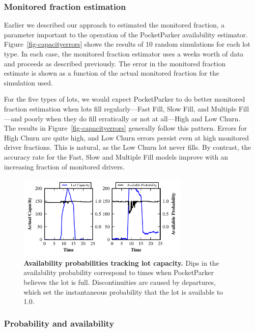 \subsubsection{Monitored fraction estimation}

Earlier we described our approach to estimated the monitored fraction, a
parameter important to the operation of the PocketParker availability
estimator. Figure~\ref{fig-capacityerrors} shows the results of 10 random
simulations for each lot type. In each case, the monitored fraction estimator
uses a weeks worth of data and proceeds as described previously. The error in
the monitored fraction estimate is shown as a function of the actual
monitored fraction for the simulation used.

For the five types of lots, we would expect PocketParker to do better
monitored fraction estimation when lots fill regularly---Fast Fill, Slow
Fill, and Multiple Fill---and poorly when they do fill erratically or not at
all---High and Low Churn. The results in Figure~\ref{fig-capacityerrors}
generally follow this pattern. Errors for High Churn are quite high, and Low
Churn errors persist even at high monitored driver fractions. This is
natural, as the Low Churn lot never fills.  By contrast, the accuracy rate for
the Fast, Slow and Multiple Fill models improve with an increasing fraction of
monitored drivers.

\begin{figure}[t]
\centering
\includegraphics[width=3.325in]{./simulator/figures/tracking_fastfill_horizontal.pdf}

\caption{\textbf{Availability probabilities tracking lot capacity.} Dips in
the availability probability correspond to times when PocketParker believes
the lot is full. Discontinuities are caused by departures, which set the
instantaneous probability that the lot is available to 1.0.}

\label{fig-trackingexample}
\end{figure}

\subsubsection{Probability and availability}

